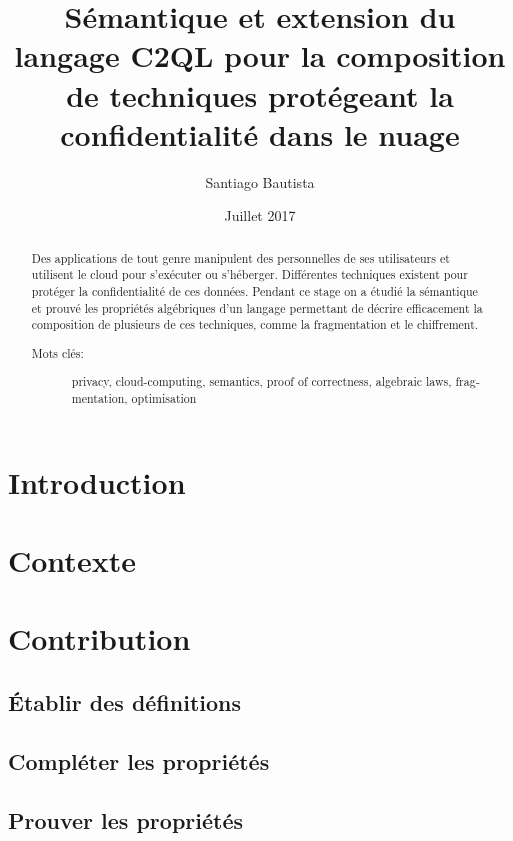 \documentclass[a4paper,11pt]{article}
\author{Santiago Bautista}
\date{Juillet 2017}
\title{Sémantique et extension du langage C2QL pour la composition de techniques protégeant la confidentialité dans le nuage}
\begin{document}
\maketitle
\begin{abstract}
	Des applications de tout genre manipulent des personnelles de ses utilisateurs
	et utilisent le cloud pour s'exécuter ou s'héberger.
	Différentes techniques existent pour protéger la confidentialité de ces données.
	Pendant ce stage on a étudié la sémantique et prouvé les propriétés algébriques d'un langage permettant de décrire
	efficacement la composition de plusieurs de ces techniques, comme la fragmentation et le chiffrement.
	\begin{description}
		\item[Mots clés:]{\begin{otherlanguage}{english}
				privacy, cloud-computing, semantics, proof of correctness, algebraic laws, fragmentation, optimisation
			\end{otherlanguage}} 
	\end{description} 
	
\end{abstract}

\tableofcontents
\pagebreak

\section{Introduction}


\section{Contexte}
\label{context}


\section{Contribution}


\subsection{Établir des définitions}
\label{defs}


\subsection{Compléter les propriétés}
\label{compl}


\subsection{Prouver les propriétés}
\label{proof}

\end{document}

